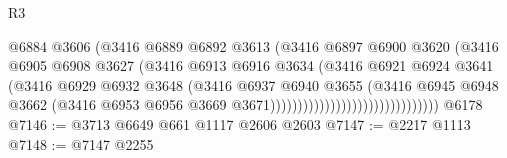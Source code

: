 \begin{lexlean}{R3}
\begin{coremodule}
                                                @6884
                                                @3606
                                                (@3416
                                                  @6889
                                                  @6892
                                                  @3613
                                                  (@3416
                                                    @6897
                                                    @6900
                                                    @3620
                                                    (@3416
                                                      @6905
                                                      @6908
                                                      @3627
                                                      (@3416
                                                        @6913
                                                        @6916
                                                        @3634
                                                        (@3416
                                                          @6921
                                                          @6924
                                                          @3641
                                                          (@3416
                                                            @6929
                                                            @6932
                                                            @3648
                                                            (@3416
                                                              @6937
                                                              @6940
                                                              @3655
                                                              (@3416
                                                                @6945
                                                                @6948
                                                                @3662
                                                                (@3416
                                                                  @6953
                                                                  @6956
                                                                  @3669
                                                                  @3671)))))))))))))))))))))))))))))))
    @6178
@7146 := @3713 @6649 @661 @1117 @2606 @2603
@7147 := @2217 @1113
@7148 := @7147 @2255

\end{coremodule}
\end{lexlean}
